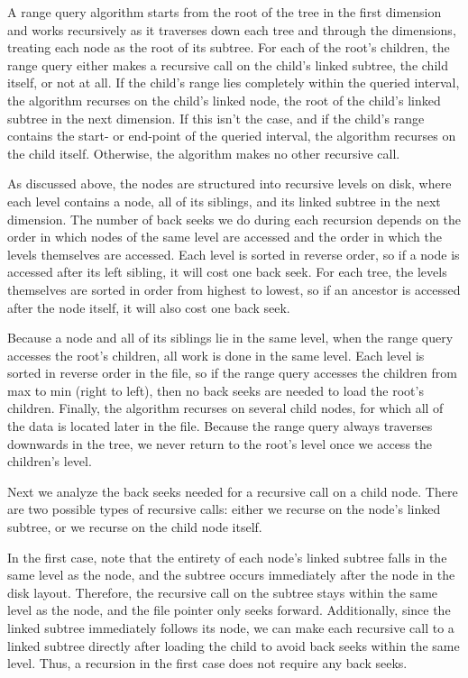 \documentclass[11pt, oneside]{article}
\begin{document}

A range query algorithm starts from the root of the tree in the first dimension
and works recursively as it traverses down each tree and through the
dimensions, treating each node as the root of its subtree. For each of the
root's children, the range query either makes a recursive call on the child's
linked subtree, the child itself, or not at all. If the child's range lies
completely within the queried interval, the algorithm recurses on the child's
linked node, the root of the child's linked subtree in the next dimension. If
this isn't the case, and if the child's range contains the start- or end-point
of the queried interval, the algorithm recurses on the child itself. Otherwise,
the algorithm makes no other recursive call. 

As discussed above, the nodes are structured into recursive levels on disk,
where each level contains a node, all of its siblings, and its linked subtree
in the next dimension. The number of back seeks we do during each recursion
depends on the order in which nodes of the same level are accessed and the
order in which the levels themselves are accessed. Each level is sorted in
reverse order, so if a node is accessed after its left sibling, it will cost
one back seek. For each tree, the levels themselves are sorted in order from
highest to lowest, so if an ancestor is accessed after the node itself, it will
also cost one back seek. 

Because a node and all of its siblings lie in the same level, when the range
query accesses the root's children, all work is done in the same level.  Each
level is sorted in reverse order in the file, so if the range query accesses the
children from max to min (right to left), then no back seeks are needed to load
the root's children. Finally, the algorithm recurses on several child nodes, for
which all of the data is located later in the file. Because the range query
always traverses downwards in the tree, we never return to the root's level once
we access the children's level.

Next we analyze the back seeks needed for a recursive call on a child node.
There are two possible types of recursive calls: either we recurse on the
node's linked subtree, or we recurse on the child node itself. 

In the first case, note that the entirety of each node's linked subtree falls in
the same level as the node, and the subtree occurs immediately after the node in
the disk layout. Therefore, the recursive call on the subtree stays within the
same level as the node, and the file pointer only seeks forward. Additionally,
since the linked subtree immediately follows its node, we can make each
recursive call to a linked subtree directly after loading the child to avoid
back seeks within the same level. Thus, a recursion in the first case does not
require any back seeks.
\end{document}
